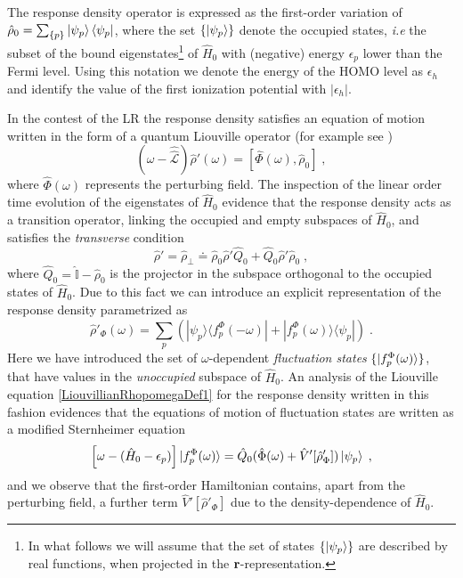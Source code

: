 \documentclass[reprint,aps,prb]{revtex4-1}
\renewcommand{\r}{{\bf r}}
\newcommand{\eps}{\epsilon}
\newcommand{\be}{\begin{equation}}
\newcommand{\ee}{\end{equation}}
\newcommand{\lb}{\label}
\newcommand{\op}[1]{\hat {#1}}
\newcommand{\sop}[1]{\op{\op {#1}}}
\newcommand{\commutator}[2]{\left[ {#1} , {#2} \right]}
\newcommand{\ketbra}[2]{| #1 \rangle \langle #2 |}
\newcommand{\dmnot}{\op{\rho}_0}
\newcommand{\dm}{\op{\rho}}
\newcommand{\hnot}{\op{H}_0}
\newcommand{\Liouv}{\sop{\mathcal L}}
\newcommand{\identity}{\op{\mathbb I}}
\begin{document}
\label{FluctuationState}

The response density operator is expressed as the first-order variation of $\dmnot=\sum_{\{p\}} \ket{\psi_p} \bra{\psi_p}$, where the set $\{\ket{\psi_p}\}$ denote the 
occupied states, \emph{i.e} the subset of the bound eigenstates\footnote{In what follows we will assume that the set of states $\{\ket{\psi_p}\}$ are described by real 
functions, when projected in the $\r$-representation.} of $\hnot$ with (negative) energy $\eps_p$ lower than the Fermi level. Using this notation we denote the energy of the HOMO level 
as $\eps_h$ and identify the value of the first ionization potential with $|\eps_h|$. 

In the contest of the LR the response density satisfies an equation of motion written in the form of a quantum Liouville operator (for example see \cite{baroni2008})
\be\lb{LiouvillianRhopomegaDef1}
\left(\omega - \Liouv\right) \dm'(\omega) =  \commutator{\op\Phi(\omega)}{\dmnot} \;,
\ee
where $\op\Phi(\omega)$ represents the perturbing field. 
The inspection of the linear order time evolution of the eigenstates of $\hnot$ evidence that the response density acts as a transition 
operator, linking the occupied and empty subspaces of $\hnot$, and satisfies the \emph{transverse} condition  
\be\lb{RhopTransverseDef1}
\dm' = \dm_{\perp} \doteq \dmnot\dm'\op Q_0 + \op Q_0\dm'\dmnot \;,
\ee
where $\op Q_0=\identity-\dmnot$ is the projector in the subspace orthogonal to the occupied states of $\hnot$. 
Due to this fact we can introduce an explicit representation of the 
response density parametrized as
\be\lb{rhoPrimeFluctuationStateDef1}
\dm'_\Phi(\omega) = \sum_p\left(\ketbra{\psi_p}{f_p^\Phi(-\omega)} + \ketbra{f_p^\Phi(\omega)}{\psi_p}\right) \;.
\ee
Here we have introduced the set of $\omega$-dependent \emph{fluctuation states} $\{\ket{f_p^\Phi(\omega)}\}$, 
that have values in the \emph{unoccupied} subspace of $\hnot$. 
An analysis of the Liouville equation \eqref{LiouvillianRhopomegaDef1} for the response density written in this fashion evidences that the equations of motion of fluctuation states are 
written as a modified Sternheimer equation~\cite{mahan1980}
\be\lb{fluctuationStateEqMotion1}
\left[\omega - (\hnot-\eps_p)\right]\ket{f_p^\Phi(\omega)} = \op Q_0(\op\Phi(\omega)+\op V'[\dm'_\Phi])\ket{\psi_p} \;,
\ee
and we observe that the first-order Hamiltonian contains, apart from the perturbing field, a further term $\op V'[\dm'_\Phi]$ due to the density-dependence of $\hnot$.
\end{document}
